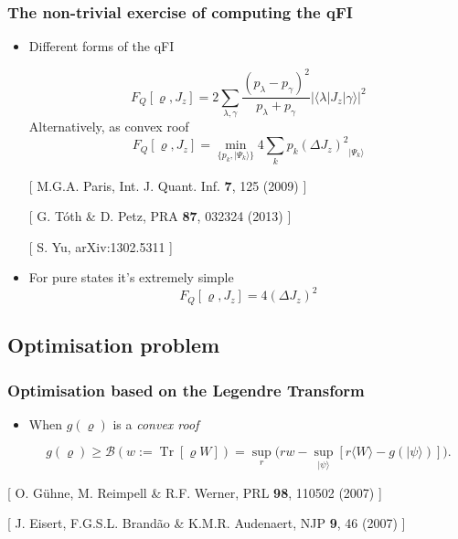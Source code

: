 \documentclass{beamer}
\DeclareMathOperator{\Tr}{Tr}
\newcommand{\ket}[1]{\ensuremath{\vert #1 \rangle}}
\newcommand{\braOket}[3]{\ensuremath{\langle #1 \vert #2 \vert #3 \rangle}}
\newcommand{\expect}[1]{\ensuremath{\langle #1 \rangle}}
\newcommand{\varian}[1]{\ensuremath{\left(\Delta #1 \right)^2}}
\newcommand{\tr}[1]{\ensuremath{\Tr \lcua #1\rcua}}
\newcommand{\citate}[1]{{\footnotesize{\color{gray}[ #1 ]}}

	}
\def\lcua{\left[}
\def\rcua{\right]}
\begin{document}
	\begin{frame}
		\tableofcontents[currentsection]

	\end{frame}

	\begin{frame}
		\frametitle{The non-trivial exercise of computing the qFI}

		\begin{itemize}
			\item<1-> Different forms of the qFI
				\begin{block}
					{}
					\small
					\[
						F_Q[\varrho,J_z]=2 \sum_{\lambda,\gamma} \frac{(p_\lambda-p_\gamma)^2}{p_\lambda+p_\gamma} |\braOket{\lambda}{J_z}{\gamma}|^2
					\]
					\hspace{10px}Alternatively, as convex roof
					\[
					  F_Q[\varrho,J_z]=\min_{\{p_k,\ket{\Psi_k}\}} 4\sum_k p_k \varian{J_z}_{\ket{\Psi_k}}
					\]
				\end{block}
				\citate{M.G.A. Paris, Int. J. Quant. Inf. \textbf{7}, 125 (2009)}
				\citate{G. T\'oth \& D. Petz, PRA \textbf{87}, 032324 (2013)}
				\citate{S. Yu, arXiv:1302.5311}
				\vspace{2px}

			\item<2-> For pure states it's extremely simple
				{\small
				\[
					F_Q[\varrho,J_z] = 4\varian{J_z}
				\]
				}

		\end{itemize}

	\end{frame}

	\subsection{Optimisation problem}

		\begin{frame}
			\frametitle{Optimisation based on the Legendre Transform}
			\begin{itemize}
				\item When $g(\varrho)$ is a \emph{\color{blue} convex roof}
					\begin{block}
						{}
						{\small
						\vspace{8px}
						\[
						g(\varrho)\geq\mathcal{B}(w:=\tr{\varrho W}) = \sup_{r} \big( r w - \sup_{\ket{\psi}} [ r\expect{W} - g(\ket{\psi}) ] \big).
						\]}
					\end{block}
			\end{itemize}

			\citate{O. G\"uhne, M. Reimpell \& R.F. Werner, PRL \textbf{98}, 110502 (2007)}
			\citate{J. Eisert, F.G.S.L. Brand\~ao \& K.M.R. Audenaert, NJP \textbf{9}, 46 (2007)}
		\end{frame}
\end{document}
